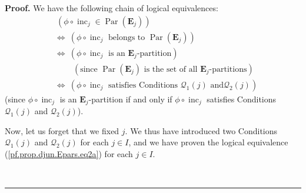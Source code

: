 \documentclass[numbers=enddot,12pt,final,onecolumn,notitlepage,abstracton]{scrartcl}
\theoremstyle{definition}
\newenvironment{proof}[1][Proof]{\noindent\textbf{#1.} }{\ \rule{0.5em}{0.5em}}
\newenvironment{verlong}{}{}
\begin{document}
\begin{verlong}
\begin{footnotesize}
\begin{proof}
We have the following chain of logical equivalences:%
\begin{align}
&  \ \left(  \phi\circ\operatorname*{inc}\nolimits_{j}\in\operatorname*{Par}%
\left(  \mathbf{E}_{j}\right)  \right) \nonumber\\
&  \Longleftrightarrow\ \left(  \phi\circ\operatorname*{inc}\nolimits_{j}%
\text{ belongs to }\operatorname*{Par}\left(  \mathbf{E}_{j}\right)  \right)
\nonumber\\
&  \Longleftrightarrow\ \left(  \phi\circ\operatorname*{inc}\nolimits_{j}%
\text{ is an }\mathbf{E}_{j}\text{-partition}\right) \nonumber\\
&  \ \ \ \ \ \ \ \ \ \ \left(  \text{since }\operatorname*{Par}\left(
\mathbf{E}_{j}\right)  \text{ is the set of all }\mathbf{E}_{j}%
\text{-partitions}\right) \nonumber\\
&  \Longleftrightarrow\ \left(  \phi\circ\operatorname*{inc}\nolimits_{j}%
\text{ satisfies Conditions }\mathcal{Q}_{1}\left(  j\right)  \text{ and
}\mathcal{Q}_{2}\left(  j\right)  \right)  \label{pf.prop.djun.Epars.eq2a}%
\end{align}
(since $\phi\circ\operatorname*{inc}\nolimits_{j}$ is an $\mathbf{E}_j
$-partition if and only if $\phi\circ\operatorname*{inc}\nolimits_{j}$
satisfies Conditions $\mathcal{Q}_{1}\left(  j\right)  $ and $\mathcal{Q}%
_{2}\left(  j\right)  $).

Now, let us forget that we fixed $j$. We thus have introduced two Conditions
$\mathcal{Q}_{1}\left(  j\right)  $ and $\mathcal{Q}_{2}\left(  j\right)  $
for each $j\in I$, and we have proven the logical equivalence
(\ref{pf.prop.djun.Epars.eq2a}) for each $j\in I$.


\end{proof}
\end{footnotesize}
\end{verlong}
\end{document}
